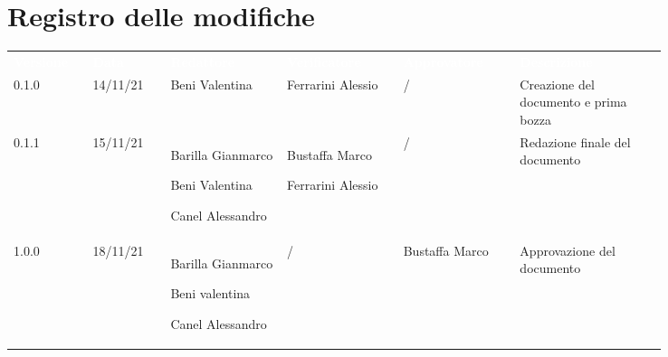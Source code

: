 \section*{Registro delle modifiche}

{\renewcommand{\arraystretch}{1.5}
\scriptsize
\begin{tabular}{p{0.10\linewidth}p{0.10\linewidth}p{0.15\linewidth}p{0.15\linewidth}p{0.15\linewidth}p{0.19\linewidth}}
	\rowcolor[RGB]{33, 73, 50}
	\textcolor{white}{\textbf{Versione}} & \textcolor{white}{\textbf{Data}} & \textcolor{white}
	{\textbf{Redattore}} & \textcolor{white}{\textbf{Verificatore}} & \textcolor{white}{\textbf{Approvatore}} & \textcolor{white}
	{\textbf{Descrizione}}\\
	\rowcolor[RGB]{216, 235, 171}
	0.1.0 & 14/11/21 & Beni Valentina & Ferrarini Alessio & / & Creazione del documento e prima bozza\\
	\rowcolor[RGB]{233, 245, 206}
	0.1.1 & 15/11/21 & Barilla Gianmarco \par  Beni Valentina  \par Canel Alessandro & Bustaffa Marco \par Ferrarini Alessio & / & Redazione finale del documento\\
	\rowcolor[RGB]{216, 235, 171}
	1.0.0 & 18/11/21 & Barilla Gianmarco \par  Beni valentina \par Canel Alessandro & / & Bustaffa Marco & Approvazione del documento
\end{tabular}	
}